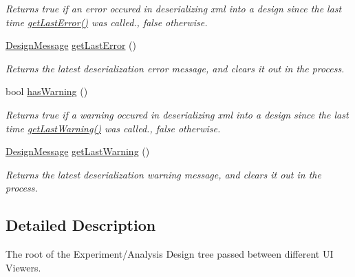 \begin{DoxyCompactItemize}
\begin{DoxyCompactList}\small\item\em Returns true if an error occured in deserializing xml into a design since the last time \hyperlink{class_picto_1_1_design_root_a280904c282f73dce02d654d06a0ebb3b}{get\-Last\-Error()} was called., false otherwise. \end{DoxyCompactList}\item 
\hypertarget{class_picto_1_1_design_root_a280904c282f73dce02d654d06a0ebb3b}{\hyperlink{struct_picto_1_1_design_message}{Design\-Message} \hyperlink{class_picto_1_1_design_root_a280904c282f73dce02d654d06a0ebb3b}{get\-Last\-Error} ()}\label{class_picto_1_1_design_root_a280904c282f73dce02d654d06a0ebb3b}

\begin{DoxyCompactList}\small\item\em Returns the latest deserialization error message, and clears it out in the process. \end{DoxyCompactList}\item 
\hypertarget{class_picto_1_1_design_root_a92b713a874879cc6d6ae3f4f90cd92ac}{bool \hyperlink{class_picto_1_1_design_root_a92b713a874879cc6d6ae3f4f90cd92ac}{has\-Warning} ()}\label{class_picto_1_1_design_root_a92b713a874879cc6d6ae3f4f90cd92ac}

\begin{DoxyCompactList}\small\item\em Returns true if a warning occured in deserializing xml into a design since the last time \hyperlink{class_picto_1_1_design_root_ae51a2bad89a82242374c605c075ce233}{get\-Last\-Warning()} was called., false otherwise. \end{DoxyCompactList}\item 
\hyperlink{struct_picto_1_1_design_message}{Design\-Message} \hyperlink{class_picto_1_1_design_root_ae51a2bad89a82242374c605c075ce233}{get\-Last\-Warning} ()
\begin{DoxyCompactList}\small\item\em Returns the latest deserialization warning message, and clears it out in the process. \end{DoxyCompactList}\end{DoxyCompactItemize}


\subsection{Detailed Description}
The root of the Experiment/\-Analysis Design tree passed between different U\-I Viewers. 

